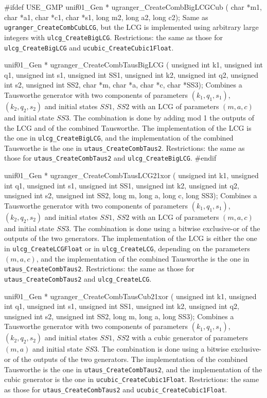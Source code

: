 #ifdef USE_GMP
   unif01_Gen * ugranger_CreateCombBigLCGCub (
      char *m1, char *a1, char *c1, char *s1, long m2, long a2, long c2);
\endcode
 \tab Same as {\tt ugranger\_CreateCombCubLCG}, but the LCG is implemented 
   using arbitrary large integers with {\tt ulcg\_CreateBigLCG}. 
   Restrictions: the same as those for {\tt ulcg\_CreateBigLCG} and
   {\tt ucubic\_CreateCubic1Float}.  
 \endtab
\code

 
   unif01_Gen * ugranger_CreateCombTausBigLCG (
      unsigned int k1, unsigned int q1, unsigned int s1, unsigned int SS1,
      unsigned int k2, unsigned int q2, unsigned int s2, unsigned int SS2,
      char *m, char *a, char *c, char *SS3);
\endcode
 \tab  Combines a Tausworthe generator with two components of parameters 
  $(k_1, q_1, s_1)$, $(k_2, q_2, s_2)$ and
  initial states $\mathit{SS1}$, $\mathit{SS2}$ with an LCG of parameters 
  $(m, a, c)$ and initial state $\mathit{SS3}$. 
  The combination is done by adding
  mod 1 the outputs of the LCG and of the combined Tausworthe.
  The implementation of the  LCG  is the one in
 {\tt ulcg\_CreateBigLCG}, and the implementation of the 
  combined  Tausworthe is the one in {\tt utaus\_CreateCombTaus2}.
  Restrictions:  the same as those for {\tt utaus\_CreateCombTaus2} and
  {\tt ulcg\_CreateBigLCG}.
 \endtab
\code
#endif


unif01_Gen * ugranger_CreateCombTausLCG21xor (
   unsigned int k1, unsigned int q1, unsigned int s1, unsigned int SS1,
   unsigned int k2, unsigned int q2, unsigned int s2, unsigned int SS2,
   long m, long a, long c, long SS3);
\endcode
 \tab  Combines a Tausworthe generator with two components of parameters 
  $(k_1, q_1, s_1)$, $(k_2, q_2, s_2)$ and
  initial states $\mathit{SS1}$, $\mathit{SS2}$ with an LCG of parameters 
  $(m, a, c)$ and initial state $\mathit{SS3}$.  The combination is done
  using a
  bitwise exclusive-or of the outputs of the two generators.
  The implementation of the  LCG  is either the one in
  {\tt ulcg\_CreateLCGFloat} or in {\tt ulcg\_CreateLCG}, 
  depending on the parameters $(m, a, c)$, and the implementation of the 
  combined  Tausworthe is the one in {\tt utaus\_CreateCombTaus2}.
  Restrictions:  the same as those for {\tt utaus\_CreateCombTaus2} and
  {\tt ulcg\_CreateLCG}.
 \endtab
\code 


unif01_Gen * ugranger_CreateCombTausCub21xor (
   unsigned int k1, unsigned int q1, unsigned int s1, unsigned int SS1,
   unsigned int k2, unsigned int q2, unsigned int s2, unsigned int SS2,
   long m, long a, long SS3);
\endcode
 \tab
  Combines a Tausworthe generator  with two components  of parameters 
  $(k_1, q_1, s_1)$, $(k_2, q_2, s_2)$  and
  initial states $\mathit{SS1}$, $\mathit{SS2}$  with a  cubic generator of
  parameters $(m, a)$ and  initial state $\mathit{SS3}$. 
  The combination is done using a
  bitwise exclusive-or of the outputs of the two generators.
  The implementation of the  
  combined  Tausworthe is the one in {\tt utaus\_CreateCombTaus2},
  and the implementation of the cubic generator
  is the one in {\tt ucubic\_CreateCubic1Float}.
  Restrictions: the same as those for  {\tt utaus\_CreateCombTaus2} and 
  {\tt ucubic\_CreateCubic1Float}.
 \endtab
\code



